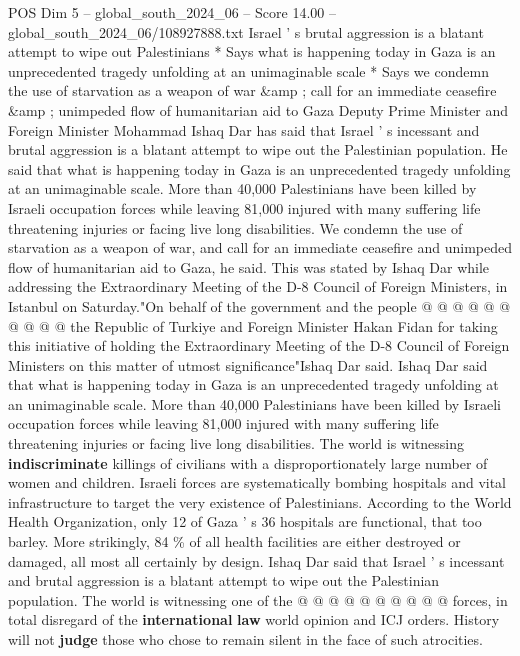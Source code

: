 \begin{textsample}{POS Dim 5 – global\_south\_2024\_06 – Score 14.00 – global\_south\_2024\_06/108927888.txt}  \label{ex:f5_pos_225}
Israel ' s brutal aggression is a blatant attempt to wipe out Palestinians * Says what is happening today in Gaza is an unprecedented tragedy unfolding at an unimaginable scale * Says we condemn the use of starvation as a weapon of war \&amp ; call for an immediate ceasefire \&amp ; unimpeded flow of humanitarian aid to Gaza Deputy Prime Minister and Foreign Minister Mohammad Ishaq Dar has said that Israel ' s incessant and brutal aggression is a blatant attempt to wipe out the Palestinian population.
He said that what is happening today in Gaza is an unprecedented tragedy unfolding at an unimaginable scale.
More than 40,000 Palestinians have been killed by Israeli occupation forces while leaving 81,000 injured with many suffering life threatening injuries or facing live long disabilities.
We condemn the use of starvation as a weapon of war, and call for an immediate ceasefire and unimpeded flow of humanitarian aid to Gaza, he said.
This was stated by Ishaq Dar while addressing the Extraordinary Meeting of the D-8 Council of Foreign Ministers, in Istanbul on Saturday."On behalf of the government and the people @ @ @ @ @ @ @ @ @ @ the Republic of Turkiye and Foreign Minister Hakan Fidan for taking this initiative of holding the Extraordinary Meeting of the D-8 Council of Foreign Ministers on this matter of utmost significance"Ishaq Dar said.
Ishaq Dar said that what is happening today in Gaza is an unprecedented tragedy unfolding at an unimaginable scale.
More than 40,000 Palestinians have been killed by Israeli occupation forces while leaving 81,000 injured with many suffering life threatening injuries or facing live long disabilities.
The world is witnessing \textbf{indiscriminate} killings of civilians with a disproportionately large number of women and children.
Israeli forces are systematically bombing hospitals and vital infrastructure to target the very existence of Palestinians.
According to the World Health Organization, only 12 of Gaza ' s 36 hospitals are functional, that too barley.
More strikingly, 84 \% of all health facilities are either destroyed or damaged, all most all certainly by design.
Ishaq Dar said that Israel ' s incessant and brutal aggression is a blatant attempt to wipe out the Palestinian population.
The world is witnessing one of the @ @ @ @ @ @ @ @ @ @ forces, in total disregard of the \textbf{international} \textbf{law} world opinion and ICJ orders.
History will not \textbf{judge} those who chose to remain silent in the face of such atrocities.

\end{textsample}
